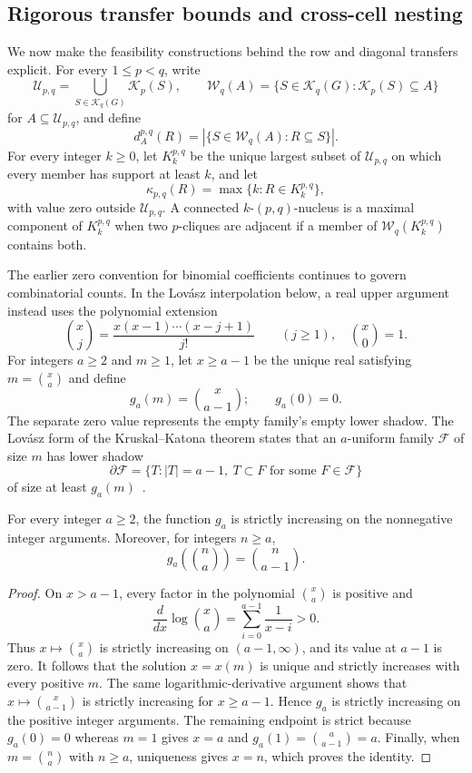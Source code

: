 \subsection{Rigorous transfer bounds and cross-cell nesting}
\label{subsec:rigorous-transfer}

We now make the feasibility constructions behind the row and diagonal transfers explicit.
%
For every $1\leq p<q$, write
\[
\mathcal U_{p,q}=\bigcup_{S\in\mathcal K_q(G)}\mathcal K_p(S),
\qquad
\mathcal W_q(A)=\{S\in\mathcal K_q(G):\mathcal K_p(S)\subseteq A\}
\]
for $A\subseteq\mathcal U_{p,q}$, and define
\[
d_A^{p,q}(R)=|\{S\in\mathcal W_q(A):R\subseteq S\}|.
\]
For every integer $k\geq0$, let $K_k^{p,q}$ be the unique largest subset of $\mathcal U_{p,q}$ on which every member has support at least $k$, and let
\[
\kappa_{p,q}(R)=\max\{k:R\in K_k^{p,q}\},
\]
with value zero outside $\mathcal U_{p,q}$.
%
A connected $k$-$(p,q)$-nucleus is a maximal component of $K_k^{p,q}$ when two $p$-cliques are adjacent if a member of $\mathcal W_q(K_k^{p,q})$ contains both.

The earlier zero convention for binomial coefficients continues to govern combinatorial counts.
%
In the Lov\'{a}sz interpolation below, a real upper argument instead uses the polynomial extension
\[
\binom{x}{j}=\frac{x(x-1)\cdots(x-j+1)}{j!}
\qquad (j\geq1),
\quad
\binom{x}{0}=1.
\]
For integers $a\geq2$ and $m\geq1$, let $x\geq a-1$ be the unique real satisfying $m=\binom xa$ and define
\[
g_a(m)=\binom{x}{a-1};
\qquad
g_a(0)=0.
\]
The separate zero value represents the empty family's empty lower shadow.
%
The Lov\'{a}sz form of the Kruskal--Katona theorem states that an $a$-uniform family $\mathcal F$ of size $m$ has lower shadow
\[
\partial\mathcal F=\{T:|T|=a-1,\ T\subset F\text{ for some }F\in\mathcal F\}
\]
of size at least $g_a(m)$~\cite{lovaszKK,kruskal1963number,katona1968theorem}.

\begin{lemma}
\label{lem:formal-lovasz-monotonicity}
For every integer $a\geq2$, the function $g_a$ is strictly increasing on the nonnegative integer arguments.
%
Moreover, for integers $n\geq a$,
\[
g_a\!\left(\binom na\right)=\binom n{a-1}.
\]
\end{lemma}
\begin{proof}
On $x>a-1$, every factor in the polynomial $\binom xa$ is positive and
\[
\frac{d}{dx}\log\binom xa=\sum_{i=0}^{a-1}\frac{1}{x-i}>0.
\]
Thus $x\mapsto\binom xa$ is strictly increasing on $(a-1,\infty)$, and its value at $a-1$ is zero.
%
It follows that the solution $x=x(m)$ is unique and strictly increases with every positive $m$.
%
The same logarithmic-derivative argument shows that $x\mapsto\binom{x}{a-1}$ is strictly increasing for $x\geq a-1$.
%
Hence $g_a$ is strictly increasing on the positive integer arguments.
%
The remaining endpoint is strict because $g_a(0)=0$ whereas $m=1$ gives $x=a$ and $g_a(1)=\binom a{a-1}=a$.
%
Finally, when $m=\binom na$ with $n\geq a$, uniqueness gives $x=n$, which proves the identity.
\end{proof}

